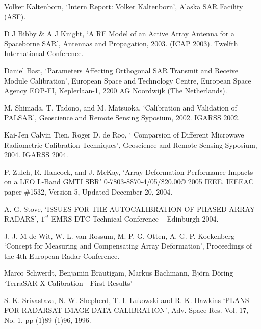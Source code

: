 \documentclass[a4paper,10pt]{article}
\begin{document}
\begin{enumerate}[ {[}1{]} ]
		\item \label{ppr:rad5} Volker Kaltenborn, \enquote*{Intern Report: 
		Volker Kaltenborn}, Alaska SAR Facility (ASF).
		
		\item \label{ppr:classic4} D J Bibby \& A J Knight, \enquote*{A RF Model
		of an Active Array Antenna for a Spaceborne SAR}, Antennas and 
		Propagation, 2003. (ICAP 2003). Twelfth International Conference.
		
		\item \label{ppr:classic5} Daniel Bast, \enquote*{Parameters Affecting 
		Orthogonal SAR Transmit and Receive Module Calibration}, European Space
		and Technology Centre, European Space Agency EOP-FI, Keplerlaan-1, 2200
		AG Noordwijk (The Netherlands).
		
		\item \label{ppr:puncTrgt3} M. Shimada, T. Tadono, and M. Matsuoka,
		\enquote*{Calibration and Validation of PALSAR}, Geoscience and Remote 
		Sensing Syposium, 2002. IGARSS 2002.
		
		\item \label{ppr:rad6} Kai-Jen Calvin Tien, Roger D. de Roo, \enquote*{
		Comparsion of Different Microwave Radiometric Calibration Techniques}, 
		Geoscience and Remote Sensing Syposium, 2004. IGARSS 2004.
		
		\item \label{ppr:aligment3} P. Zulch, R. Hancock, and J. McKay, 
		\enquote*{Array Deformation Performance Impacts on a LEO L-Band GMTI 
		SBR} 0-7803-8870-4/05/\$20.00© 2005 IEEE. IEEEAC paper \#1532, Version 
		5, Updated December 20, 2004.

		\item \label{ppr:classic6} A. G. Stove, \enquote*{ISSUES FOR THE 
		AUTOCALIBRATION OF PHASED ARRAY RADARS}, $1^{st}$ EMRS DTC Technical 
		Conference – Edinburgh 2004.
		
		\item \label{ppr:aligment4} J. J. M de Wit, W. L. van Rossum, M. P. G. 
		Otten, A. G. P. Koekenberg \enquote*{Concept for Measuring and 
		Compensating Array Deformation}, Proceedings of the 4th European Radar 
		Conference.
		
		\item \label{ppr:rad7} Marco Schwerdt, Benjamin Bräutigam, Markus 
		Bachmann, Björn Döring \enquote*{TerraSAR-X Calibration - First Results}

		\item \label{ppr:classic-ext1} S. K. Srivastava, N. W. Shepherd, T. I. 
		Lukowski and R. K. Hawkins \enquote*{PLANS FOR RADARSAT IMAGE DATA
		CALIBRATION}, Adv. Space Res. Vol. 17, No. 1, pp (1)89-(1)96, 1996.


\end{enumerate}
\end{document}
